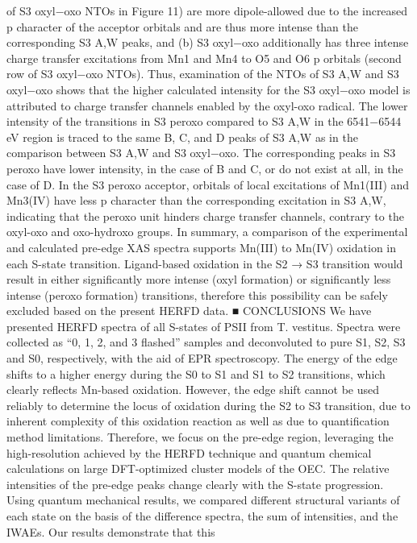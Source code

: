 \documentclass{article}
\begin{document}
of S3
oxyl−oxo NTOs in Figure 11) are more dipole-allowed due
to the increased p character of the acceptor orbitals and are
thus more intense than the corresponding S3
A,W peaks, and (b)
S3
oxyl−oxo additionally has three intense charge transfer
excitations from Mn1 and Mn4 to O5 and O6 p orbitals
(second row of S3
oxyl−oxo NTOs). Thus, examination of the
NTOs of S3
A,W and S3
oxyl−oxo shows that the higher calculated
intensity for the S3
oxyl−oxo model is attributed to charge transfer
channels enabled by the oxyl-oxo radical.
The lower intensity of the transitions in S3
peroxo compared to
S3
A,W in the 6541−6544 eV region is traced to the same B, C,
and D peaks of S3
A,W as in the comparison between S3
A,W and
S3
oxyl−oxo. The corresponding peaks in S3
peroxo have lower
intensity, in the case of B and C, or do not exist at all, in the
case of D. In the S3
peroxo acceptor, orbitals of local excitations
of Mn1(III) and Mn3(IV) have less p character than the
corresponding excitation in S3
A,W, indicating that the peroxo
unit hinders charge transfer channels, contrary to the oxyl-oxo
and oxo-hydroxo groups.
In summary, a comparison of the experimental and
calculated pre-edge XAS spectra supports Mn(III) to Mn(IV)
oxidation in each S-state transition. Ligand-based oxidation in
the S2 → S3 transition would result in either significantly more
intense (oxyl formation) or significantly less intense (peroxo
formation) transitions, therefore this possibility can be safely
excluded based on the present HERFD data.
■ CONCLUSIONS
We have presented HERFD spectra of all S-states of PSII from
T. vestitus. Spectra were collected as “0, 1, 2, and 3 flashed”
samples and deconvoluted to pure S1, S2, S3 and S0,
respectively, with the aid of EPR spectroscopy. The energy
of the edge shifts to a higher energy during the S0 to S1 and S1
to S2 transitions, which clearly reflects Mn-based oxidation.
However, the edge shift cannot be used reliably to determine
the locus of oxidation during the S2 to S3 transition, due to
inherent complexity of this oxidation reaction as well as due to
quantification method limitations. Therefore, we focus on the
pre-edge region, leveraging the high-resolution achieved by the
HERFD technique and quantum chemical calculations on large
DFT-optimized cluster models of the OEC.
The relative intensities of the pre-edge peaks change clearly
with the S-state progression. Using quantum mechanical
results, we compared different structural variants of each
state on the basis of the difference spectra, the sum of
intensities, and the IWAEs. Our results demonstrate that this
\end{document}
